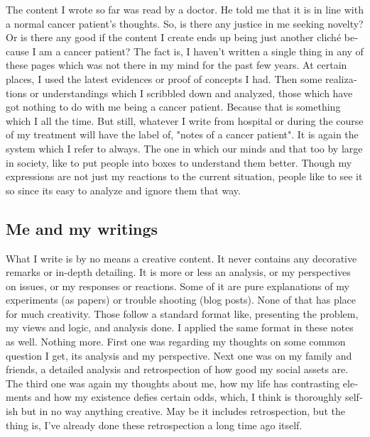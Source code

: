 \begin{english}
The content I wrote so far was read by a doctor. He told me that it is in line with a normal cancer patient's thoughts. So, is there any justice in me seeking novelty? Or is there any good if the content I create ends up being just another cliché because I am a cancer patient? The fact is, I haven't written a single thing in any of these pages which was not there in my mind for the past few years. At certain places, I used the latest evidences or proof of concepts I had. Then some realizations or understandings which I scribbled down and analyzed, those  which have got nothing to do with me being a cancer patient. Because that is something which I all the time. But still, whatever I write from hospital or during the course of my treatment will have the label of, "notes of a cancer patient". It is again the system which I refer to always. The one in which our minds and that too by large in society, like to put people into boxes to understand them better. Though my expressions are not just my reactions to the current situation, people like to see it so since its easy to analyze and ignore them that way.

\subsection*{Me and my writings}

What I write is by no means a creative content. It never contains any decorative remarks or in-depth detailing. It is more or less an analysis, or my perspectives on issues, or my responses or reactions. Some of it are pure explanations of my experiments (as papers) or trouble shooting (blog posts). None of that has place for much creativity. Those follow a standard format like, presenting the problem, my views and logic, and analysis done. I applied the same format in these notes as well. Nothing more. First one was regarding my thoughts on some common question I get, its analysis and my perspective. Next one was on my family and friends, a detailed analysis and retrospection of how good my social assets are. The third one was again my thoughts about me, how my life has contrasting elements and how my existence defies certain odds, which, I think is thoroughly selfish but in no way anything creative. May be it includes retrospection, but the thing is, I've already done these retrospection a long time ago itself.


\end{english}
